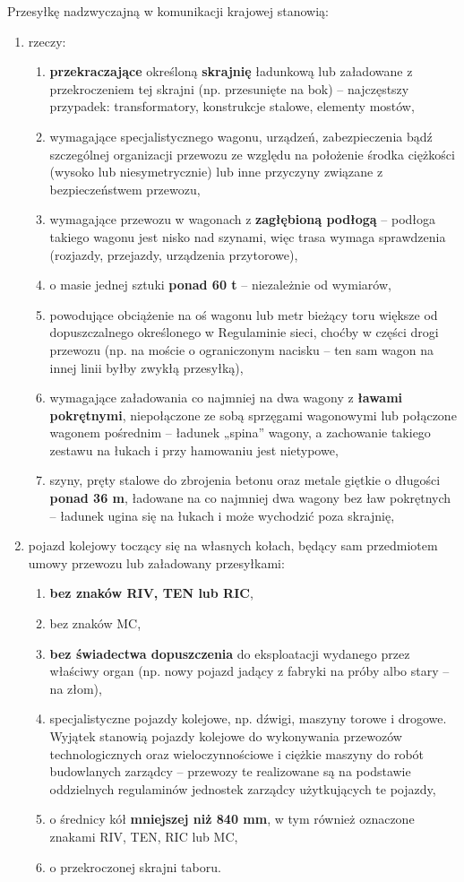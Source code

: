 Przesyłkę nadzwyczajną w komunikacji krajowej stanowią:
\begin{enumerate}
	\item rzeczy:
	\begin{enumerate}
		\item \textbf{przekraczające} określoną \textbf{skrajnię} ładunkową lub załadowane z przekroczeniem tej skrajni (np. przesunięte na bok) – najczęstszy przypadek: transformatory, konstrukcje stalowe, elementy mostów,
		\item wymagające specjalistycznego wagonu, urządzeń, zabezpieczenia bądź szczególnej organizacji przewozu ze względu na położenie środka ciężkości (wysoko lub niesymetrycznie) lub inne przyczyny związane z bezpieczeństwem przewozu,
		\item wymagające przewozu w wagonach z \textbf{zagłębioną podłogą} – podłoga takiego wagonu jest nisko nad szynami, więc trasa wymaga sprawdzenia (rozjazdy, przejazdy, urządzenia przytorowe),
		\item o masie jednej sztuki \textbf{ponad 60 t} – niezależnie od wymiarów,
		\item powodujące obciążenie na oś wagonu lub metr bieżący toru większe od dopuszczalnego określonego w Regulaminie sieci, choćby w części drogi przewozu (np. na moście o ograniczonym nacisku – ten sam wagon na innej linii byłby zwykłą przesyłką),
		\item wymagające załadowania co najmniej na dwa wagony z \textbf{ławami pokrętnymi}, niepołączone ze sobą sprzęgami wagonowymi lub połączone wagonem pośrednim – ładunek „spina” wagony, a zachowanie takiego zestawu na łukach i przy hamowaniu jest nietypowe,
		\item szyny, pręty stalowe do zbrojenia betonu oraz metale giętkie o długości \textbf{ponad 36 m}, ładowane na co najmniej dwa wagony bez ław pokrętnych – ładunek ugina się na łukach i może wychodzić poza skrajnię,
	\end{enumerate}
	\item pojazd kolejowy toczący się na własnych kołach, będący sam przedmiotem umowy przewozu lub załadowany przesyłkami:
	\begin{enumerate}
		\item \textbf{bez znaków RIV, TEN lub RIC},
		\item bez znaków MC,
		\item \textbf{bez świadectwa dopuszczenia} do eksploatacji wydanego przez właściwy organ (np. nowy pojazd jadący z fabryki na próby albo stary – na złom),
		\item specjalistyczne pojazdy kolejowe, np. dźwigi, maszyny torowe i drogowe. Wyjątek stanowią pojazdy kolejowe do wykonywania przewozów technologicznych oraz wieloczynnościowe i ciężkie maszyny do robót budowlanych zarządcy – przewozy te realizowane są na podstawie oddzielnych regulaminów jednostek zarządcy użytkujących te pojazdy,
		\item o średnicy kół \textbf{mniejszej niż 840 mm}, w tym również oznaczone znakami RIV, TEN, RIC lub MC,
		\item o przekroczonej skrajni taboru.
	\end{enumerate}
\end{enumerate}

